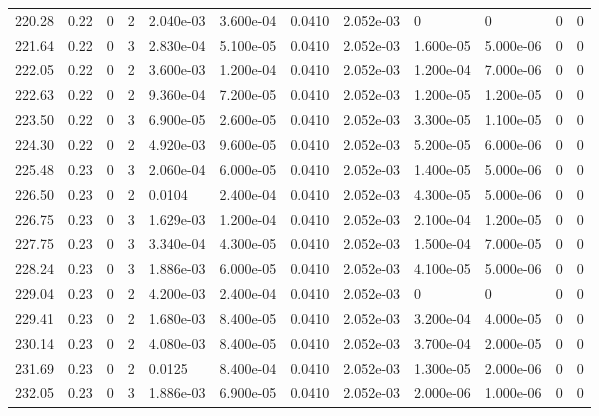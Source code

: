 \documentclass[preview]{standalone}
\begin{document}
{{{{{{{{{\begin{tabular}{L{1.2cm}C{1.2cm} C{0.3cm}C{0.5cm} C{1.4cm}C{1.4cm} C{1.4cm}C{1.4cm} C{1.6cm}C{1.6cm} C{1.6cm}C{1.6cm}}
  220.28  &  0.22  & 0     &  2 &  2.040e-03  & 3.600e-04  &  0.0410&   2.052e-03& 0 & 0   &  0 & 0  \\ 
  221.64  &  0.22  & 0     &  3 &  2.830e-04  & 5.100e-05  &  0.0410&   2.052e-03& 1.600e-05 & 5.000e-06   &  0 & 0  \\ 
  222.05  &  0.22  & 0     &  2 &  3.600e-03  & 1.200e-04  &  0.0410&   2.052e-03& 1.200e-04 & 7.000e-06   &  0 & 0  \\ 
  222.63  &  0.22  & 0     &  2 &  9.360e-04  & 7.200e-05  &  0.0410&   2.052e-03& 1.200e-05 & 1.200e-05   &  0 & 0  \\ 
  223.50  &  0.22  & 0     &  3 &  6.900e-05  & 2.600e-05  &  0.0410&   2.052e-03& 3.300e-05 & 1.100e-05   &  0 & 0  \\ 
  224.30  &  0.22  & 0     &  2 &  4.920e-03  & 9.600e-05  &  0.0410&   2.052e-03& 5.200e-05 & 6.000e-06   &  0 & 0  \\ 
  225.48  &  0.23  & 0     &  3 &  2.060e-04  & 6.000e-05  &  0.0410&   2.052e-03& 1.400e-05 & 5.000e-06   &  0 & 0  \\ 
  226.50  &  0.23  & 0     &  2 &  0.0104  & 2.400e-04  &  0.0410&   2.052e-03& 4.300e-05 & 5.000e-06   &  0 & 0  \\ 
  226.75  &  0.23  & 0     &  3 &  1.629e-03  & 1.200e-04  &  0.0410&   2.052e-03& 2.100e-04 & 1.200e-05   &  0 & 0  \\ 
  227.75  &  0.23  & 0     &  3 &  3.340e-04  & 4.300e-05  &  0.0410&   2.052e-03& 1.500e-04 & 7.000e-05   &  0 & 0  \\ 
  228.24  &  0.23  & 0     &  3 &  1.886e-03  & 6.000e-05  &  0.0410&   2.052e-03& 4.100e-05 & 5.000e-06   &  0 & 0  \\ 
  229.04  &  0.23  & 0     &  2 &  4.200e-03  & 2.400e-04  &  0.0410&   2.052e-03& 0 & 0   &  0 & 0  \\ 
  229.41  &  0.23  & 0     &  2 &  1.680e-03  & 8.400e-05  &  0.0410&   2.052e-03& 3.200e-04 & 4.000e-05   &  0 & 0  \\ 
  230.14  &  0.23  & 0     &  2 &  4.080e-03  & 8.400e-05  &  0.0410&   2.052e-03& 3.700e-04 & 2.000e-05   &  0 & 0  \\ 
  231.69  &  0.23  & 0     &  2 &  0.0125  & 8.400e-04  &  0.0410&   2.052e-03& 1.300e-05 & 2.000e-06   &  0 & 0  \\ 
  232.05  &  0.23  & 0     &  3 &  1.886e-03  & 6.900e-05  &  0.0410&   2.052e-03& 2.000e-06 & 1.000e-06   &  0 & 0  \\ 
\hline 
\end{tabular} 

}}}}}}}}}
\end{document}
